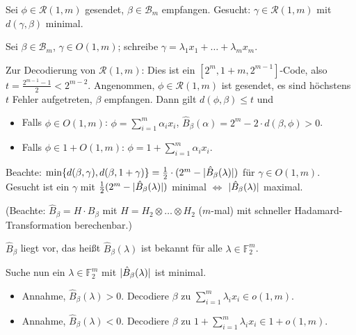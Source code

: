 \documentclass{cheat-sheet}
\newcommand{\F}{\mathbb{F}} %
\newcommand{\RM}{\mathcal{R}} %
\begin{document}
Sei $\phi \in \RM(1, m)$ gesendet, $\beta \in \mathcal{B}_m$ empfangen.
Gesucht: $\gamma \in \RM(1, m)$ mit $d(\gamma, \beta)$ minimal.

\begin{satz}
  Sei $\beta \in \mathcal{B}_m$, $\gamma \in O(1, m)$; schreibe $\gamma = \lambda_1 x_1 + \ldots + \lambda_m x_m$.
  \begin{itemize}
  \end{itemize}
\end{satz}

Zur Decodierung von $\RM(1, m)$: Dies ist ein $[2^m, 1+m, 2^{m-1}]$-Code, also $t = \tfrac{2^{m-1} - 1}{2} < 2^{m-2}$.
Angenommen, $\phi \in \RM(1, m)$ ist gesendet, es sind höchstens $t$ Fehler aufgetreten, $\beta$ empfangen.
Dann gilt $d(\phi, \beta) \leq t$ und
\begin{itemize}
  \item Falls $\phi \in O(1, m)$: $\phi = \sum_{i=1}^m \alpha_i x_i$, $\hat{B}_\beta(\alpha) = 2^m - 2 \cdot d(\beta, \phi) > 0$.
  \item Falls $\phi \in 1 + O(1, m)$: $\phi = 1 + \sum_{i=1}^m \alpha_i x_i$.
\end{itemize}

Beachte: $\min \{ d(\beta, \gamma), d(\beta, 1 + \gamma) \} = \tfrac{1}{2} \cdot (2^m - \lvert\hat{B}_\beta(\lambda)\rvert)$ für $\gamma \in O(1, m)$.
Gesucht ist ein $\gamma$ mit $\tfrac{1}{2} (2^m - \lvert\hat{B}_\beta(\lambda)\rvert)$ minimal $\iff$ $\lvert\hat{B}_\beta(\lambda)\rvert$ maximal.

(Beachte: $\hat{B}_\beta = H \cdot B_\beta$ mit $H = H_2 \otimes \ldots \otimes H_2$ ($m$-mal) mit schneller Hadamard-Transformation berechenbar.)

$\hat{B}_\beta$ liegt vor, das heißt $\hat{B}_\beta(\lambda)$ ist bekannt für alle $\lambda \in \F_2^m$.

Suche nun ein $\lambda \in \F_2^m$ mit $\lvert\hat{B}_\beta(\lambda)\rvert$ ist minimal.

\begin{itemize}
  \item Annahme, $\hat{B}_\beta(\lambda) > 0$.
  Decodiere $\beta$ zu $\sum_{i=1}^m \lambda_i x_i \in o(1, m)$.
  \item Annahme, $\hat{B}_\beta(\lambda) < 0$. Decodiere $\beta$ zu $1 + \sum_{i=1}^m \lambda_i x_i \in 1 + o(1, m)$.
\end{itemize}
\end{document}
